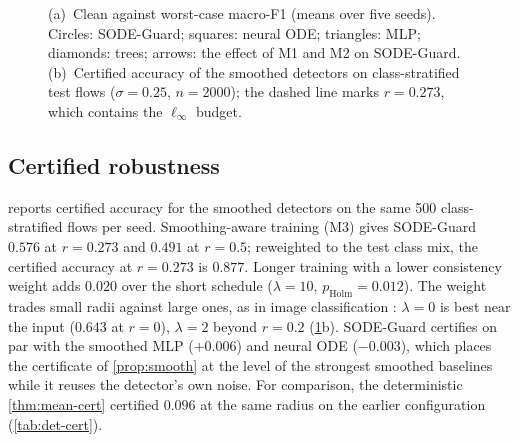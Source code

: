 \documentclass{article}
\theoremstyle{definition}
\begin{document}
\begin{figure}[t]
\caption{(a)~Clean against worst-case macro-F1 (means over five seeds).
Circles: SODE-Guard; squares: neural ODE; triangles: MLP; diamonds: trees;
arrows: the effect of M1 and M2 on SODE-Guard. (b)~Certified accuracy of the
smoothed detectors on class-stratified test flows ($\sigma=0.25$, $n=2000$);
the dashed line marks $r=0.273$, which contains the $\ell_\infty$ budget.}
\label{fig:results}
\end{figure}

\subsection{Certified robustness}
 reports certified accuracy for the smoothed detectors on the same
500 class-stratified flows per seed. Smoothing-aware training (M3) gives
SODE-Guard $0.576$ at $r=0.273$ and $0.491$ at $r=0.5$; reweighted to the test
class mix, the certified accuracy at $r=0.273$ is $0.877$. Longer training with a
lower consistency weight adds $0.020$ over the short schedule ($\lambda=10$,
$p_{\mathrm{Holm}}=0.012$). The
weight trades small radii against large ones, as in image classification
\citep{jeong2020consistency}: $\lambda=0$ is best near the input ($0.643$ at
$r=0$), $\lambda=2$ beyond $r=0.2$ (\cref{fig:results}b). SODE-Guard certifies
on par with the smoothed MLP ($+0.006$) and neural ODE ($-0.003$), which places
the certificate of \cref{prop:smooth} at the level of the strongest smoothed
baselines while it reuses the detector's own noise. For comparison, the
deterministic \cref{thm:mean-cert} certified $0.096$ at the same radius on the
earlier configuration (\cref{tab:det-cert}).
\end{document}
